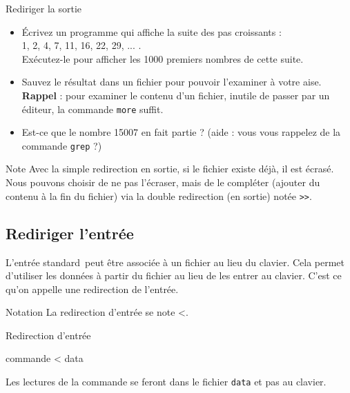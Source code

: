 \documentclass[a4paper,11pt]{article}
\begin{document}
            \newpage
\begin{Exercice}{Rediriger la sortie}
	\begin{itemize}
			\item Écrivez un programme qui affiche la suite des pas croissants :\\
				 1, 2, 4, 7, 11, 16, 22, 29, ... .\\
				  Ex\'ecutez-le pour afficher les 1000 premiers nombres de cette suite.
					
			\item Sauvez le r\'esultat dans un fichier pour pouvoir l'examiner \`a votre aise.\\
				\textbf{Rappel} : pour examiner le contenu d'un fichier, inutile de passer par un \'editeur,
				la commande \verb_more_ suffit.
					
			\item Est-ce que le nombre 15007 en fait partie ? (aide : vous vous rappelez de la commande \verb_grep_ ?)
					
	\end{itemize}
				

\end{Exercice}

\begin{coltbox}{Note} 
	Avec la simple redirection en sortie, si le fichier existe d\'ej\`a, il est \'ecras\'e. 
	Nous pouvons choisir de ne pas l'\'ecraser, mais de le compl\'eter 
	(ajouter du contenu \`a la fin du fichier) via la double redirection (en sortie) not\'ee 
					\verb_>>_.			
	
\end{coltbox}


	\subsection{Rediriger l'entrée}

		L'\og entr\'ee standard\fg\,  peut \^etre associ\'ee \`a un fichier au
		lieu du clavier.  Cela permet d'utiliser les donn\'ees \`a partir du
		fichier au lieu de les entrer au clavier.  C'est ce qu'on appelle une
		redirection de l'entr\'ee.
			
		\medskip	
		\begin{coltbox}{Notation}
			La redirection d'entr\'ee se note \guillemotleft <\guillemotright .
		\end{coltbox}
        \par
		\begin{Exemple}{Redirection d'entrée}
		        \begin{Console}
		        		commande < data
			\end{Console}
		\end{Exemple}
		Les lectures de la commande se feront dans le fichier \verb_data_
		et pas au clavier.
		
\end{document}
